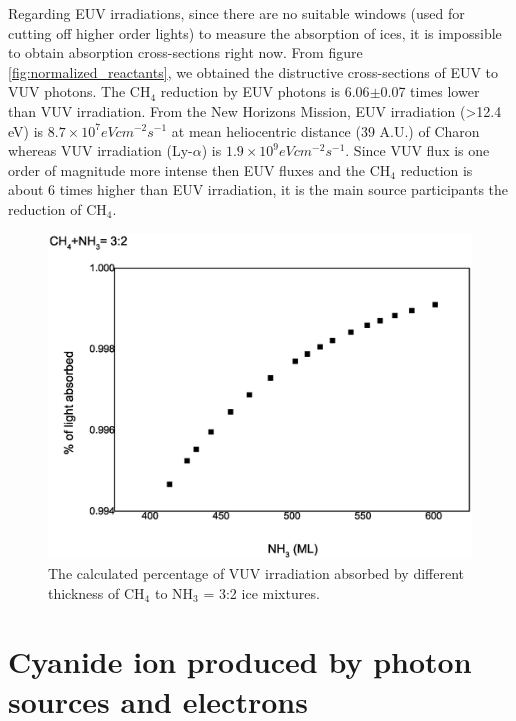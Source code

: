 Regarding EUV irradiations, since there are no suitable windows (used for cutting off higher order lights) to measure the absorption of ices, it is impossible to obtain absorption cross-sections right now. From figure \ref{fig:normalized_reactants}, we obtained the distructive cross-sections of EUV to VUV photons. The CH$_4$ reduction by EUV photons is 6.06$\pm$0.07 times lower than VUV irradiation.  From the New Horizons Mission, EUV irradiation (>12.4 eV) is $8.7 \times 10^7 eV cm^{-2} s^{-1}$ at mean heliocentric distance (39 A.U.) of Charon whereas VUV irradiation (Ly-$\alpha$) is $1.9 \times 10^9 eV cm^{-2} s^{-1}$\cite{grundy2016formation}. Since VUV flux is one order of magnitude more intense then EUV fluxes and the CH$_4$ reduction is about 6 times higher than EUV irradiation, it is the main source participants the reduction of CH$_4$. 

\begin{figure}
\centering
\includegraphics[width=\textwidth]{figures/chapter4/absorption.eps}
\caption{The calculated percentage of VUV irradiation absorbed by different thickness of CH$_4$ to NH$_3$ = 3:2 ice mixtures.}
\label{fig:absorption_percentage}
\end{figure}

\section{Cyanide ion produced by photon sources and electrons} %

